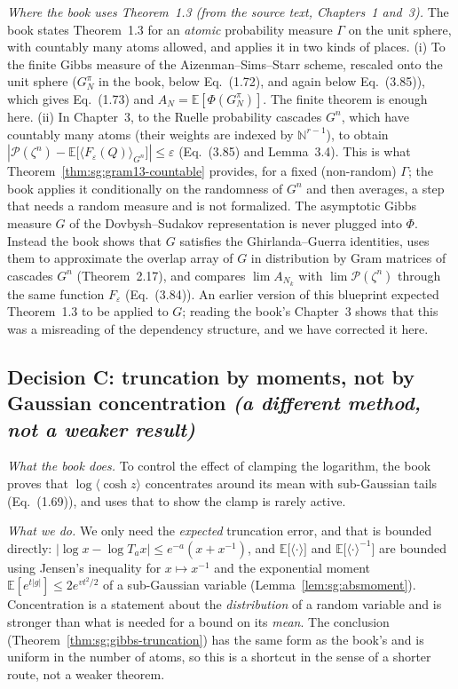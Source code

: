 \emph{Where the book uses Theorem~1.3 (from the source text, Chapters~1 and~3).} The book states Theorem~1.3 for an \emph{atomic} probability measure $\Gamma$ on the unit sphere, with countably many atoms allowed, and applies it in two kinds of places.
(i) To the finite Gibbs measure of the Aizenman--Sims--Starr scheme, rescaled onto the unit sphere ($G^\pi_N$ in the book, below Eq.~(1.72), and again below Eq.~(3.85)), which gives Eq.~(1.73) and $A_N=\mathbb E[\Phi(G^\pi_N)]$. The finite theorem is enough here.
(ii) In Chapter~3, to the Ruelle probability cascades $G^n$, which have countably many atoms (their weights are indexed by $\mathbb N^{r-1}$), to obtain $|\mathscr P(\zeta^n)-\mathbb E\big[\langle F_\varepsilon(Q)\rangle_{G^n}\big]|\le\varepsilon$ (Eq.~(3.85) and Lemma~3.4). This is what Theorem~\ref{thm:sg:gram13-countable} provides, for a fixed (non-random) $\Gamma$; the book applies it conditionally on the randomness of $G^n$ and then averages, a step that needs a random measure and is not formalized.
The asymptotic Gibbs measure $G$ of the Dovbysh--Sudakov representation is never plugged into $\Phi$. Instead the book shows that $G$ satisfies the Ghirlanda--Guerra identities, uses them to approximate the overlap array of $G$ in distribution by Gram matrices of cascades $G^n$ (Theorem~2.17), and compares $\lim A_{N_k}$ with $\lim\mathscr P(\zeta^n)$ through the same function $F_\varepsilon$ (Eq.~(3.84)).
An earlier version of this blueprint expected Theorem~1.3 to be applied to $G$; reading the book's Chapter~3 shows that this was a misreading of the dependency structure, and we have corrected it here.

\subsection*{Decision C: truncation by moments, not by Gaussian concentration \emph{(a different method, not a weaker result)}}

\emph{What the book does.} To control the effect of clamping the logarithm, the book proves that $\log\langle\cosh z\rangle$ concentrates around its mean with sub-Gaussian tails (Eq.~(1.69)), and uses that to show the clamp is
rarely active.

\emph{What we do.} We only need the \emph{expected} truncation error, and that is bounded directly: $|\log x-\log T_ax|\le e^{-a}(x+x^{-1})$, and $\mathbb E\big[\langle\cdot\rangle\big]$ and $\mathbb E\big[\langle\cdot\rangle^{-1}\big]$ are bounded using
Jensen's inequality for $x\mapsto x^{-1}$ and the exponential moment $\mathbb E[e^{t|g|}]\le2e^{vt^2/2}$ of a sub-Gaussian variable (Lemma~\ref{lem:sg:absmoment}). Concentration is a statement about the \emph{distribution} of a random variable and is
stronger than what is needed for a bound on its \emph{mean}. The conclusion (Theorem~\ref{thm:sg:gibbs-truncation}) has the same form as the book's and is uniform in the number of atoms, so this is a shortcut in the sense of a shorter route,
not a weaker theorem.

